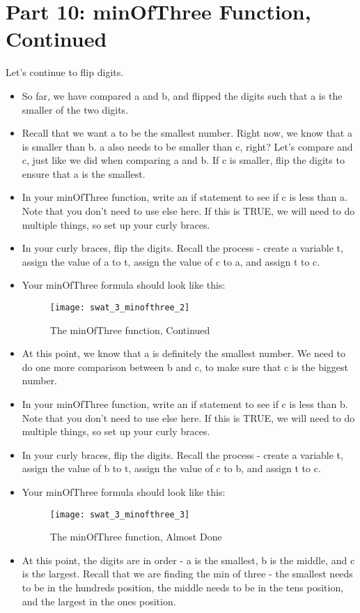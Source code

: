 \documentclass{article}
\begin{document}
\section*{Part 10: minOfThree Function, Continued}
Let's continue to flip digits.
\begin{itemize}
	\item So far, we have compared a and b, and flipped the digits such that a is the smaller of the two digits.
	\item Recall that we want a to be the smallest number.  Right now, we know that a is smaller than b.  a also needs to be smaller than c, right?  Let's compare and c, just like we did when comparing a and b.  If c is smaller, flip the digits to ensure that a is the smallest.
	\item In your minOfThree function, write an if statement to see if c is less than a.  Note that you don't need to use else here.  If this is TRUE, we will need to do multiple things, so set up your curly braces.
	\item In your curly braces, flip the digits.  Recall the process - create a variable t, assign the value of a to t, assign the value of c to a, and assign t to c.
	\item Your minOfThree formula should look like this:
	\begin{figure}[H]
  		\centering
  		\texttt{[image: swat\_3\_minofthree\_2]}
  		\caption{The minOfThree function, Continued}
	\end{figure}
	\item At this point, we know that a is definitely the smallest number.  We need to do one more comparison between b and c, to make sure that c is the biggest number.
	\item In your minOfThree function, write an if statement to see if c is less than b.  Note that you don't need to use else here.  If this is TRUE, we will need to do multiple things, so set up your curly braces.
	\item In your curly braces, flip the digits.  Recall the process - create a variable t, assign the value of b to t, assign the value of c to b, and assign t to c.
	\item Your minOfThree formula should look like this:
	\begin{figure}[H]
  		\centering
  		\texttt{[image: swat\_3\_minofthree\_3]}
  		\caption{The minOfThree function, Almost Done}
	\end{figure}
	\item At this point, the digits are in order - a is the smallest, b is the middle, and c is the largest.  Recall that we are finding the min of three - the smallest needs to be in the hundreds position, the middle needs to be in the tens position, and the largest in the ones position.

\end{itemize}
\end{document}

